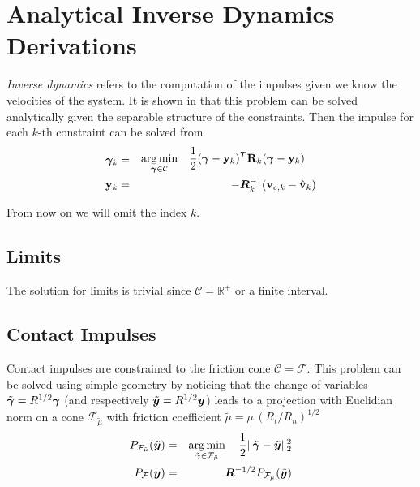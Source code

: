 \section{Analytical Inverse Dynamics Derivations}
\label{app:analytical_inverse_dynamics_derivations}

\textit{Inverse dynamics} refers to the computation of the impulses given we
know the velocities of the system. It is shown in \cite{bib:todorov2014} that
this problem can be solved analytically given the separable structure of the
constraints. Then the impulse for each $k\text{-th}$ constraint can be solved
from
\begin{eqnarray}
	{\bm\gamma}_k&=&
	\begin{aligned}
		\operatorname*{arg\,min}_{{\bm\gamma}\in\mathcal{C}} \quad &
	\frac{1}{2}({\bm\gamma}-{\mathbf{y}}_k)^T{\mathbf{R}}_k({\bm\gamma}-{\mathbf{y}}_k) \end{aligned}\\
	{\mathbf{y}}_k &=& -{\bm{R}}_k^{-1}({\mathbf{v}}_{c,k}-\hat{{\mathbf{v}}}_k)
\end{eqnarray}

From now on we will omit the index $k$. 

\subsection{Limits}
The solution for limits is trivial since $\mathcal{C}=\mathbb{R}^+$ or a finite
interval. 

\subsection{Contact Impulses}

Contact impulses are constrained to the friction cone $\mathcal{C}=\mathcal{F}$.
This problem can be solved using simple geometry by noticing that the change of
variables $\tilde{{\bm\gamma}}=R^{1/2}{\bm\gamma}$ (and respectively
$\tilde{{\bm{y}}}=R^{1/2}{\bm{y}}$) leads to a projection with Euclidian norm on a
cone $\mathcal{F}_{\tilde\mu}$ with friction coefficient
$\tilde\mu=\mu\,(R_t/R_n)^{1/2}$
\begin{eqnarray}
	P_\mathcal{F_{\tilde\mu}}(\tilde{\vf{y}})&=&\argmin_{\tilde\bgamma\in\mathcal{F_{\tilde\mu}}}
		\quad \frac{1}{2}\Vert\tilde\bgamma-\tilde{\vf{y}}\Vert_2^2\nonumber\\
	P_\mathcal{F}(\vf{y}) &=&
	\vf{R}^{-1/2}P_\mathcal{F_{\tilde\mu}}(\tilde{\vf{y}})
	\label{eq:local_optimization_problem_tilde}
\end{eqnarray}

